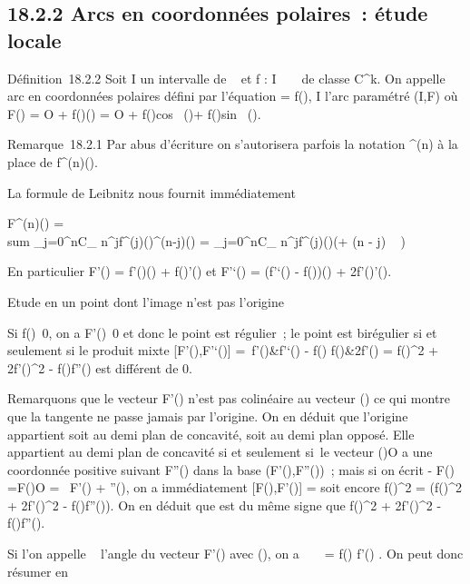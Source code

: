 \documentclass[]{article}
\begin{document}
\subsection{18.2.2 Arcs en coordonnées polaires~: étude locale}

Définition~18.2.2 Soit I un intervalle de ~ et f : I \rightarrow~ ~ de classe
C^k. On appelle arc en coordonnées polaires défini par
l'équation \rho = f(\theta), \theta \in I l'arc paramétré (I,F) où F(\theta) = O +
f(\theta)\vecu(\theta) = O + f(\theta)cos~
(\theta)\vec\imath + f(\theta)sin~
(\theta).

Remarque~18.2.1 Par abus d'écriture on s'autorisera parfois la notation
\rho^(n) à la place de f^(n)(\theta).

La formule de Leibnitz nous fournit immédiatement

F^(n)(\theta) = \\sum
_j=0^nC_
n^jf^(j)(\theta)\vecu^(n-j)(\theta)
= \sum _j=0^nC_
n^jf^(j)(\theta)\vecu(\theta + (n - j) \pi~
 )

En particulier F'(\theta) = f'(\theta)\vecu(\theta) +
f(\theta)\vecu'(\theta) et F'`(\theta) = (f'`(\theta) -
f(\theta))\vecu(\theta) + 2f'(\theta)\vecu'(\theta).

Etude en un point dont l'image n'est pas l'origine

Si f(\theta)\neq~0, on a
F'(\theta)\neq~0 et donc le point est régulier~; le
point est birégulier si et seulement si le produit mixte
[F'(\theta),F'`(\theta)] = \left
\matrix\,f'(\theta)&f'`(\theta) - f(\theta)
\cr f(\theta)&2f'(\theta) \right  =
f(\theta)^2 + 2f'(\theta)^2 - f(\theta)f''(\theta) est différent de 0.

Remarquons que le vecteur F'(\theta) n'est pas colinéaire au vecteur
\overrightarrowOF(\theta) ce qui montre que la tangente ne
passe jamais par l'origine. On en déduit que l'origine appartient soit
au demi plan de concavité, soit au demi plan opposé. Elle appartient au
demi plan de concavité si et seulement si~le vecteur
\overrightarrowF(\theta)O a une coordonnée positive
suivant F''(\theta) dans la base (F'(\theta),F''(\theta))~; mais si on écrit - F(\theta)
=\overrightarrow F(\theta)O = \lambda~F'(\theta) + \muF''(\theta), on a
immédiatement [F(\theta),F'(\theta)] =  soit encore
f(\theta)^2 = \mu(f(\theta)^2 + 2f'(\theta)^2 -
f(\theta)f''(\theta)). On en déduit que \mu est du même signe que f(\theta)^2
+ 2f'(\theta)^2 - f(\theta)f''(\theta).

Si l'on appelle \alpha~ l'angle du vecteur F'(\theta) avec
\vecu(\theta), on a
\mathrmtg~ \alpha~ = f(\theta)
\over f'(\theta) . On peut donc résumer en
\end{document}
